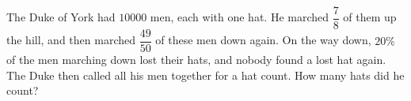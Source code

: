 The Duke of York had $10000$ men, each with one hat. He marched $\dfrac78$ of them up the hill, and then marched $\dfrac{49}{50}$ of these men down again. On the way down, $20\%$ of the men marching down lost their hats, and nobody found a lost hat again. The Duke then called all his men together for a hat count. How many hats did he count?
